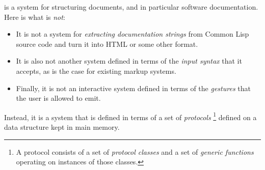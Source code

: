 \sysname{} is a system for structuring documents, and in particular
software documentation.  Here is what \sysname{} is \emph{not}:

\begin{itemize}
\item It is not a system for \emph{extracting documentation strings}
  from Common Lisp source code and turn it into HTML or some other
  format.
\item It is also not another system defined in terms of the
  \emph{input syntax} that it accepts, as is the case for existing
  markup systems.
\item Finally, it is not an interactive system defined in terms of the
  \emph{gestures} that the user is allowed to emit.
\end{itemize}

Instead, it is a system that is defined in terms of a set of \clos{}
\emph{protocols}%
\footnote{A \clos{} protocol consists of a set of \emph{protocol
    classes} and a set of \emph{generic functions} operating on
  instances of those classes.}
defined on a data structure kept in main memory.
